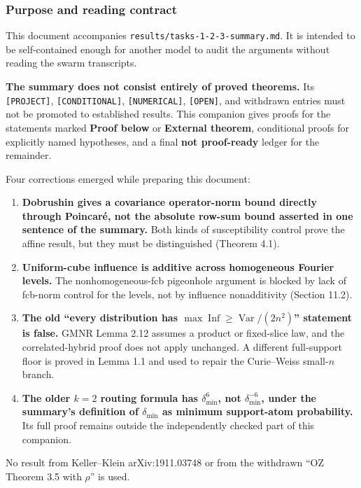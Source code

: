 \subsubsection{Purpose and reading contract}\label{purpose-and-reading-contract}

This document accompanies \texttt{results/tasks-1-2-3-summary.md}. It is intended to be self-contained enough for another model to audit the arguments without reading the swarm transcripts.

\textbf{The summary does not consist entirely of proved theorems.} Its \texttt{{[}PROJECT{]}}, \texttt{{[}CONDITIONAL{]}}, \texttt{{[}NUMERICAL{]}}, \texttt{{[}OPEN{]}}, and withdrawn entries must not be promoted to established results. This companion gives proofs for the statements marked \textbf{Proof below} or \textbf{External theorem}, conditional proofs for explicitly named hypotheses, and a final \textbf{not proof-ready} ledger for the remainder.

Four corrections emerged while preparing this document:

\begin{enumerate}
\def\labelenumi{\arabic{enumi}.}
\tightlist
\item
  \textbf{Dobrushin gives a covariance operator-norm bound directly through Poincaré, not the absolute row-sum bound asserted in one sentence of the summary.} Both kinds of susceptibility control prove the affine result, but they must be distinguished (Theorem 4.1).
\item
  \textbf{Uniform-cube influence is additive across homogeneous Fourier levels.} The nonhomogeneous-fcb pigeonhole argument is blocked by lack of fcb-norm control for the levels, not by influence nonadditivity (Section 11.2).
\item
  \textbf{The old ``every distribution has \(\max\operatorname{Inf}\ge\operatorname{Var}/(2n^2)\)'' statement is false.} GMNR Lemma 2.12 assumes a product or fixed-slice law, and the correlated-hybrid proof does not apply unchanged. A different full-support floor is proved in Lemma 1.1 and used to repair the Curie--Weiss small-\(n\) branch.
\item
  \textbf{The older \(k=2\) routing formula has \(\delta_{\min}^{6}\), not \(\delta_{\min}^{-6}\), under the summary's definition of \(\delta_{\min}\) as minimum support-atom probability.} Its full proof remains outside the independently checked part of this companion.
\end{enumerate}

No result from Keller--Klein arXiv:1911.03748 or from the withdrawn ``OZ Theorem 3.5 with \(\rho\)'' is used.

